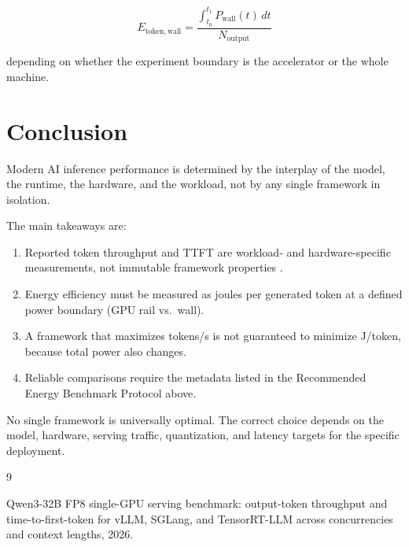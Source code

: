 \documentclass[11pt,a4paper]{article}
\begin{document}
\[
\boxed{
E_{\mathrm{token,wall}}
=
\frac{
\int_{t_0}^{t_1}P_{\mathrm{wall}}(t)\,dt
}{
N_{\mathrm{output}}
}
}
\]

depending on whether the experiment boundary is the accelerator or
the whole machine.

\section{Conclusion}

Modern AI inference performance is determined by the interplay of
the model, the runtime, the hardware, and the workload, not by any
single framework in isolation.

The main takeaways are:

\begin{enumerate}
    \item Reported token throughput and TTFT are workload- and
    hardware-specific measurements, not immutable framework
    properties \cite{benchmark2026}.
    \item Energy efficiency must be measured as joules per generated
    token at a defined power boundary (GPU rail vs.\ wall).
    \item A framework that maximizes tokens/s is not guaranteed to
    minimize J/token, because total power also changes.
    \item Reliable comparisons require the metadata listed in the
    Recommended Energy Benchmark Protocol above.
\end{enumerate}

No single framework is universally optimal.  The correct choice
depends on the model, hardware, serving traffic, quantization, and
latency targets for the specific deployment.

\begin{thebibliography}{9}

Qwen3-32B FP8 single-GPU serving benchmark: output-token throughput
and time-to-first-token for vLLM, SGLang, and TensorRT-LLM across
concurrencies and context lengths, 2026.

\end{thebibliography}
\end{document}
